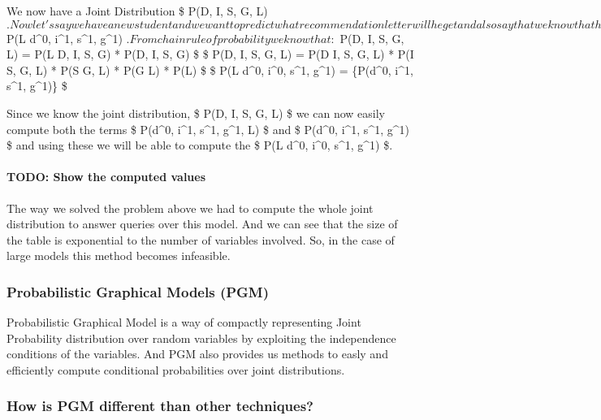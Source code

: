 \documentclass{article}
\begin{document}
    We now have a Joint Distribution \$ P(D, I, S, G, L)
$. Now let's say we have a new student and we want to predict what recommendation letter will he get and also say that we know that he is intelligent, the course was easy, his SAT score is good, and also he got a good grade. So, basically we want to compute $
P(L \textbar{} d\^{}0, i\^{}1, s\^{}1, g\^{}1)
$. From chain rule of probability we know that: $ P(D, I, S, G, L) = P(L
\textbar{} D, I, S, G) * P(D, I, S, G) \$ \$ P(D, I, S, G, L) = P(D
\textbar{} I, S, G, L) * P(I \textbar{} S, G, L) * P(S \textbar{} G, L)
* P(G \textbar{} L) * P(L) \$ \$ P(L \textbar{} d\^{}0, i\^{}0, s\^{}1,
g\^{}1) =  \{P(d\^{}0, i\^{}1, s\^{}1,
g\^{}1)\} \$

Since we know the joint distribution, \$ P(D, I, S, G, L) \$ we can now
easily compute both the terms \$ P(d\^{}0, i\^{}1, s\^{}1, g\^{}1, L) \$
and \$ P(d\^{}0, i\^{}1, s\^{}1, g\^{}1) \$ and using these we will be
able to compute the \$ P(L \textbar{} d\^{}0, i\^{}0, s\^{}1, g\^{}1)
\$.

\paragraph{TODO: Show the computed
values}\label{todo-show-the-computed-values}

    The way we solved the problem above we had to compute the whole joint
distribution to answer queries over this model. And we can see that the
size of the table is exponential to the number of variables involved.
So, in the case of large models this method becomes infeasible.

    \subsubsection{Probabilistic Graphical Models
(PGM)}\label{probabilistic-graphical-models-pgm}

Probabilistic Graphical Model is a way of compactly representing Joint
Probability distribution over random variables by exploiting the
independence conditions of the variables. And PGM also provides us
methods to easly and efficiently compute conditional probabilities over
joint distributions.

    \subsubsection{How is PGM different than other
techniques?}\label{how-is-pgm-different-than-other-techniques}
\end{document}
